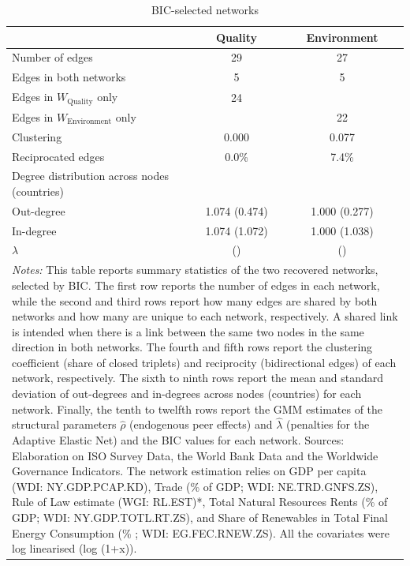 \begin{table}[H]\centering
\caption{BIC-selected networks}\label{tab:network_eu_lagged}
\begin{tabular}{lcc}\hline\hline
& Quality & Environment \\\hline
Number of edges & 29 & 27 \\
Edges in both networks & 5 & 5 \\
Edges in $W_{\text{Quality}}$ only & 24 & \\
Edges in $W_{\text{Environment}}$ only & & 22 \\
Clustering & 0.000 & 0.077 \\
Reciprocated edges & 0.0\% & 7.4\% \\
Degree distribution across nodes (countries) & & \\
\quad Out-degree & 1.074 (0.474) & 1.000 (0.277) \\
\quad In-degree & 1.074 (1.072) & 1.000 (1.038) \\
\hline
$\lambda$ & () & () \\
\hline\hline
\multicolumn{3}{p{0.95\textwidth}}{\footnotesize \textit{Notes:} This table reports summary statistics of the two recovered networks, selected by BIC. The first row reports the number of edges in each network, while the second and third rows report how many edges are shared by both networks and how many are unique to each network, respectively. A shared link is intended when there is a link between the same two nodes in the same direction in both networks. The fourth and fifth rows report the clustering coefficient (share of closed triplets) and reciprocity (bidirectional edges) of each network, respectively. The sixth to ninth rows report the mean and standard deviation of out-degrees and in-degrees across nodes (countries) for each network. Finally, the tenth to twelfth rows report the GMM estimates of the structural parameters $\hat{\rho}$ (endogenous peer effects) and $\hat{\lambda}$ (penalties for the Adaptive Elastic Net) and the BIC values for each network. Sources: Elaboration on ISO Survey Data, the World Bank Data and the Worldwide Governance Indicators. The network estimation relies on GDP per capita (WDI: NY.GDP.PCAP.KD), Trade (\% of GDP; WDI: NE.TRD.GNFS.ZS), Rule of Law estimate (WGI: RL.EST)*, Total Natural Resources Rents (\% of GDP; WDI: NY.GDP.TOTL.RT.ZS), and Share of Renewables in Total Final Energy Consumption (\% ; WDI: EG.FEC.RNEW.ZS). All the covariates were log linearised (log (1+x)).} \\
\end{tabular}\end{table}
